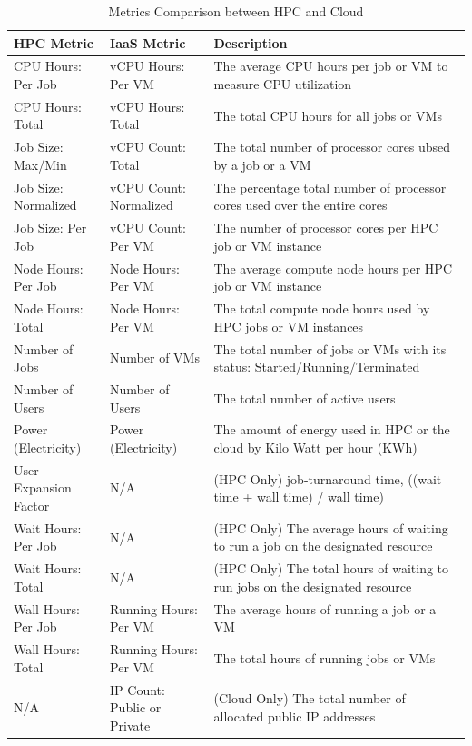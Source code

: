 \documentclass{sig-alternate-05-2015}
\begin{document}
\begin{table}[htb]
  \caption{Metrics Comparison between HPC and Cloud}
\begin{scriptsize}
\label{T:xdmod2}
 \begin{tabular}{l|l|l} 
HPC Metric & IaaS Metric & Description \\
\hline
CPU Hours: Per Job  & vCPU Hours: Per VM & The average CPU hours per job or VM to measure CPU utilization \\
CPU Hours: Total  & vCPU Hours: Total & The total CPU hours for all jobs or VMs \\
Job Size: Max/Min  & vCPU Count: Total & The total number of processor cores ubsed by a job or a VM \\
Job Size: Normalized  & vCPU Count: Normalized & The percentage total number of processor cores used over the entire cores\\
Job Size: Per Job  & vCPU Count: Per VM & The number of processor cores per HPC job or VM instance\\
Node Hours: Per Job  & Node Hours: Per VM & The average compute node hours per HPC job or VM instance \\
Node Hours: Total  & Node Hours: Per VM & The total compute node hours used by HPC jobs or VM instances \\
Number of Jobs & Number of VMs & The total number of jobs or VMs with its status: Started/Running/Terminated\\
Number of Users & Number of Users & The total number of active users \\
Power (Electricity) & Power (Electricity) & The amount of energy used in HPC or the cloud by Kilo Watt per hour (KWh) \\
User Expansion Factor  & N/A & (HPC Only) job-turnaround time, 
((wait time + wall time) / wall time)\\
Wait Hours: Per Job  & N/A & (HPC Only) The average hours of waiting to run a job on the designated resource\\
Wait Hours: Total  & N/A & (HPC Only) The total hours of waiting to run jobs on the designated resource \\
Wall Hours: Per Job  & Running Hours: Per VM &  The average hours of running a job or a VM\\
Wall Hours: Total  & Running Hours: Per VM & The total hours of running jobs or VMs \\
N/A & IP Count: Public or Private & (Cloud Only) The total number of allocated public IP addresses \\

\end{tabular}
\end{scriptsize}
\end{table}
\end{document}
